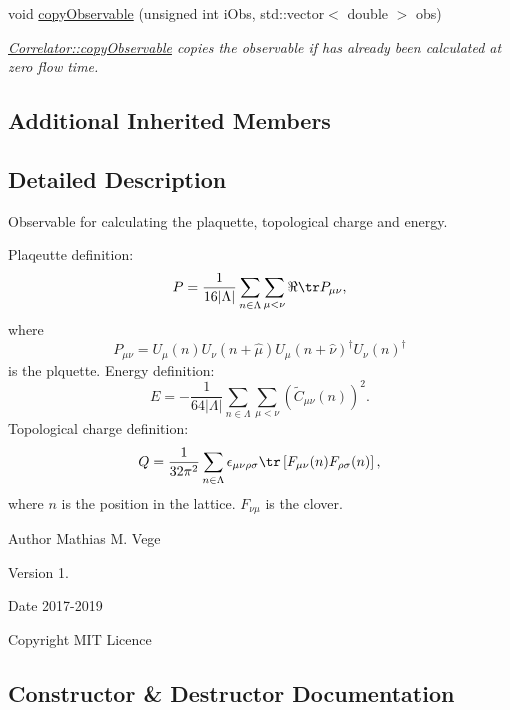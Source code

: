 \begin{DoxyCompactItemize}
void \mbox{\hyperlink{class_master_sampler_a893be9ba7dca98cb8d9d3cb30e42fcc3}{copy\+Observable}} (unsigned int i\+Obs, std\+::vector$<$ double $>$ obs)
\begin{DoxyCompactList}\small\item\em \mbox{\hyperlink{class_correlator_ac780d8b180294ee4801ede6e6a13f7f4}{Correlator\+::copy\+Observable}} copies the observable if has already been calculated at zero flow time. \end{DoxyCompactList}\end{DoxyCompactItemize}
\subsection*{Additional Inherited Members}


\subsection{Detailed Description}
Observable for calculating the plaquette, topological charge and energy. 

Plaqeutte definition\+: \[ P = \frac{1}{16|\Lambda|} \sum_{n\in\Lambda} \sum_{\mu < \nu} \Re \tr P_{\mu\nu}, \] where \[ P_{\mu\nu}=U_\mu(n) U_{\nu}(n+\hat{\mu}) U_{\mu}(n+\hat{\nu})^\dagger U_{\nu} (n)^\dagger \] is the plquette. Energy definition\+: \[ E = -\frac{1}{64|\Lambda|} \sum_{n\in\Lambda} \sum_{\mu<\nu} \left(\tilde{C}_{\mu\nu}(n)\right)^2. \] Topological charge definition\+: \[ Q = \frac{1}{32\pi^2} \sum_{n\in\Lambda} \epsilon_{\mu\nu\rho\sigma} \tr\left[F_{\mu\nu}(n)F_{\rho\sigma}(n)\right], \] where $n$ is the position in the lattice. $F_{\nu\mu}$ is the clover.

\begin{DoxyAuthor}{Author}
Mathias M. Vege 
\end{DoxyAuthor}
\begin{DoxyVersion}{Version}
1. 
\end{DoxyVersion}
\begin{DoxyDate}{Date}
2017-\/2019 
\end{DoxyDate}
\begin{DoxyCopyright}{Copyright}
M\+IT Licence 
\end{DoxyCopyright}


\subsection{Constructor \& Destructor Documentation}
\mbox{\label{class_master_sampler_ac5ee503e8391aca36f73872a45bb6bd9}} 
